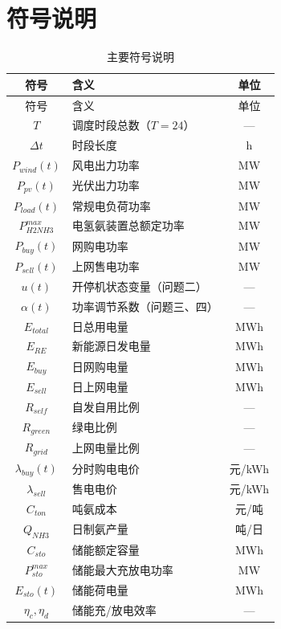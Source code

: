 \section{符号说明}

\begin{longtable}{clc}
\caption{主要符号说明}\label{tab:symbols} \\
\toprule
符号 & 含义 & 单位 \\
\midrule
\endfirsthead
\toprule
符号 & 含义 & 单位 \\
\midrule
\endhead
$T$ & 调度时段总数（$T=24$） & --- \\
$\Delta t$ & 时段长度 & h \\
$P_{wind}(t)$ & 风电出力功率 & MW \\
$P_{pv}(t)$ & 光伏出力功率 & MW \\
$P_{load}(t)$ & 常规电负荷功率 & MW \\
$P_{H2NH3}^{max}$ & 电氢氨装置总额定功率 & MW \\
$P_{buy}(t)$ & 网购电功率 & MW \\
$P_{sell}(t)$ & 上网售电功率 & MW \\
$u(t)$ & 开停机状态变量（问题二） & --- \\
$\alpha(t)$ & 功率调节系数（问题三、四） & --- \\
$E_{total}$ & 日总用电量 & MWh \\
$E_{RE}$ & 新能源日发电量 & MWh \\
$E_{buy}$ & 日网购电量 & MWh \\
$E_{sell}$ & 日上网电量 & MWh \\
$R_{self}$ & 自发自用比例 & --- \\
$R_{green}$ & 绿电比例 & --- \\
$R_{grid}$ & 上网电量比例 & --- \\
$\lambda_{buy}(t)$ & 分时购电电价 & 元/kWh \\
$\lambda_{sell}$ & 售电电价 & 元/kWh \\
$C_{ton}$ & 吨氨成本 & 元/吨 \\
$Q_{NH3}$ & 日制氨产量 & 吨/日 \\
$C_{sto}$ & 储能额定容量 & MWh \\
$P_{sto}^{max}$ & 储能最大充放电功率 & MW \\
$E_{sto}(t)$ & 储能荷电量 & MWh \\
$\eta_c, \eta_d$ & 储能充/放电效率 & --- \\
\bottomrule
\end{longtable}
